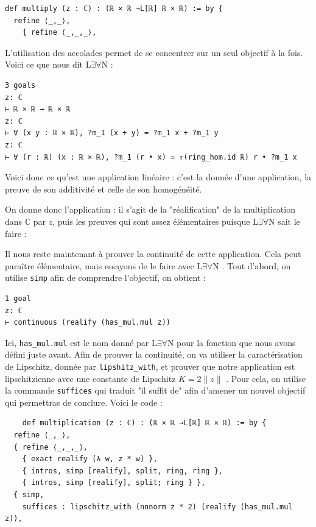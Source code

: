 \documentclass[a4paper, 11pt, twoside]{report}
\newcommand\C{\mathbb{C}}
\newcommand{\LEAN}{L$\exists\forall$N }
\begin{document}
\begin{lstlisting}
def multiply (z : ℂ) : (ℝ × ℝ →L[ℝ] ℝ × ℝ) := by {
  refine ⟨_,_⟩,
  	{ refine ⟨_,_,_⟩, 
\end{lstlisting}
  	
L'utilisation des accolades permet de se concentrer sur un seul objectif à la fois. Voici ce que nous dit \LEAN :

\begin{lstlisting}
3 goals
z: ℂ
⊢ ℝ × ℝ → ℝ × ℝ
z: ℂ
⊢ ∀ (x y : ℝ × ℝ), ?m_1 (x + y) = ?m_1 x + ?m_1 y
z: ℂ
⊢ ∀ (r : ℝ) (x : ℝ × ℝ), ?m_1 (r • x) = ⇑(ring_hom.id ℝ) r • ?m_1 x
\end{lstlisting}

Voici donc ce qu'est une application linéaire : c'est la donnée d'une application, la preuve de son additivité et celle de son homogénéité.

On donne donc l'application : il s'agit de la "réalification" de la multiplication dans $\C$ par $z$, puis les preuves qui sont assez élémentaires puisque \LEAN sait le faire :


Il nous reste maintenant à prouver la continuité de cette application. Cela peut paraître élémentaire, mais essayons de le faire avec \LEAN. Tout d'abord, on utilise \verb|simp| afin de comprendre l'objectif, on obtient :

\begin{lstlisting}
1 goal
z: ℂ
⊢ continuous (realify (has_mul.mul z)) 
\end{lstlisting}

Ici, \verb|has_mul.mul| est le nom donné par \LEAN pour la fonction que nous avons défini juste avant. Afin de prouver la continuité, on va utiliser la caractérisation de Lipschitz, donnée par \verb|lipshitz_with|, et prouver que notre application est lipschitzienne avec une constante de Lipschitz $K = 2\|z\|$ . Pour cela, on utilise la commande \verb|suffices| qui traduit "il suffit de" afin d'amener un nouvel objectif qui permettras de conclure. Voici le code :

\begin{lstlisting}
	def multiplication (z : ℂ) : (ℝ × ℝ →L[ℝ] ℝ × ℝ) := by {
  refine ⟨_,_⟩,
  { refine ⟨_,_,_⟩,
    { exact realify (λ w, z * w) },
    { intros, simp [realify], split, ring, ring },
    { intros, simp [realify], split; ring } },
  { simp, 
    suffices : lipschitz_with (nnnorm z * 2) (realify (has_mul.mul z)),
\end{lstlisting}
    
\end{document}
